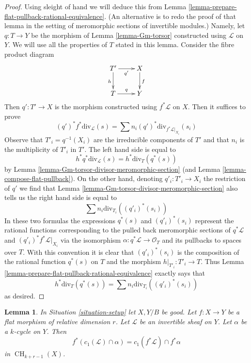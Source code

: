 \documentclass{stacks-project}
\theoremstyle{plain}
\newtheorem{lemma}[subsection]{Lemma}
\theoremstyle{definition}
\theoremstyle{remark}
\numberwithin{equation}{subsection}
\def\CH{\mathop{\mathrm{CH}}\nolimits}
\begin{document}
\begin{proof}
Using sleight of hand we will deduce this from
Lemma \ref{lemma-prepare-flat-pullback-rational-equivalence}.
(An alternative is to redo the proof of that lemma in the
setting of meromorphic sections of invertible modules.)
Namely, let $q : T \to Y$ be the morphism of
Lemma \ref{lemma-Gm-torsor} constructed using $\mathcal{L}$ on $Y$.
We will use all the properties of $T$ stated in this lemma.
Consider the fibre product diagram
$$
\xymatrix{
T' \ar[r]_{q'} \ar[d]_h & X \ar[d]^f \\
T \ar[r]^q & Y
}
$$
Then $q' : T' \to X$ is the morphism constructed using $f^*\mathcal{L}$
on $X$. Then it suffices to prove
$$
(q')^*f^*\text{div}_\mathcal{L}(s) =
\sum n_i (q')^*\text{div}_{f^*\mathcal{L}|_{X_i}}(s_i)
$$
Observe that $T'_i = q^{-1}(X_i)$ are the irreducible components of $T'$
and that $n_i$ is the multiplicity of $T'_i$ in $T'$.
The left hand side is equal to
$$
h^*q^*\text{div}_\mathcal{L}(s) = h^*\text{div}_T(q^*(s))
$$
by Lemma \ref{lemma-Gm-torsor-divisor-meromorphic-section}
(and Lemma \ref{lemma-compose-flat-pullback}).
On the other hand, denoting $q'_i : T'_i \to X_i$
the restriction of $q'$ we find that
Lemma \ref{lemma-Gm-torsor-divisor-meromorphic-section}
also tells us the right hand side is equal to
$$
\sum n_i \text{div}_{T_i}((q'_i)^*(s_i))
$$
In these two formulas the expressions $q^*(s)$ and $(q'_i)^*(s_i)$
represent the rational functions corresponding to the pulled back
meromorphic sections of $q^*\mathcal{L}$ and $(q'_i)^*f^*\mathcal{L}|_{X_i}$
via the isomorphism $\alpha : q^*\mathcal{L} \to \mathcal{O}_T$
and its pullbacks to spaces over $T$. With this convention it is
clear that $(q'_i)^*(s_i)$ is the composition of the rational function
$q^*(s)$ on $T$ and the morphism $h|_{T'_i} : T'_i \to T$.
Thus Lemma \ref{lemma-prepare-flat-pullback-rational-equivalence}
exactly says that
$$
h^*\text{div}_T(q^*(s)) = \sum n_i \text{div}_{T_i}((q'_i)^*(s_i))
$$
as desired.
\end{proof}

\begin{lemma}
\label{lemma-flat-pullback-cap-c1}
In Situation \ref{situation-setup} let $X, Y/B$ be good.
Let $f : X \to Y$ be a flat morphism of relative dimension $r$.
Let $\mathcal{L}$ be an invertible sheaf on $Y$.
Let $\alpha$ be a $k$-cycle on $Y$.
Then
$$
f^*(c_1(\mathcal{L}) \cap \alpha) = c_1(f^*\mathcal{L}) \cap f^*\alpha
$$
in $\CH_{k + r - 1}(X)$.
\end{lemma}
\end{document}
